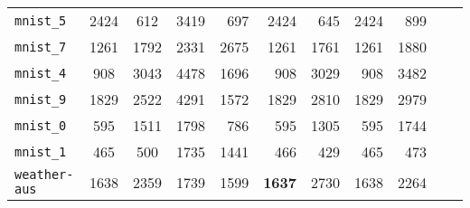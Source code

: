 \begin{tabular}{lccrrrrrrrr}
\texttt{mnist\_5} & 2424 & 612 & 3419 & 697 & 2424 & 645 & 2424 & 899\\
\texttt{mnist\_7} & 1261 & 1792 & 2331 & 2675 & 1261 & 1761 & 1261 & 1880\\
\texttt{mnist\_4} & 908 & 3043 & 4478 & 1696 & 908 & 3029 & 908 & 3482\\
\texttt{mnist\_9} & 1829 & 2522 & 4291 & 1572 & 1829 & 2810 & 1829 & 2979\\
\texttt{mnist\_0} & 595 & 1511 & 1798 & 786 & 595 & 1305 & 595 & 1744\\
\texttt{mnist\_1} & 465 & 500 & 1735 & 1441 & 466 & 429 & 465 & 473\\
\texttt{weather-aus} & 1638 & 2359 & 1739 & 1599 & \textbf{1637} & 2730 & 1638 & 2264\\
\bottomrule
\end{tabular}
